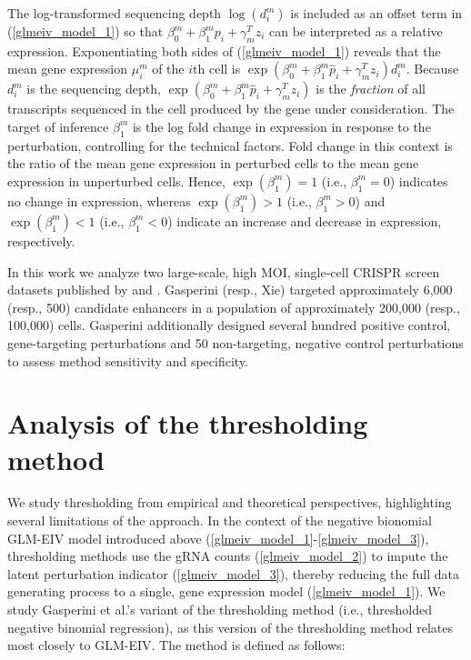 \documentclass[12pt]{article}
\begin{document}
The log-transformed sequencing depth $\log(d^m_i)$ is included as an offset term in (\ref{glmeiv_model_1}) so that $\beta^m_0 + \beta^m_1 p_i + \gamma^T_m z_i$ can be interpreted as a relative expression. Exponentiating both sides of (\ref{glmeiv_model_1}) reveals that the mean gene expression $\mu_i^m$ of the $i$th cell is
$\exp \left( \beta^m_0 + \beta^m_1 \hat{p}_i + \gamma^T_m z_i \right) d_i^m.$ Because $d^m_i$ is the sequencing depth, $\exp \left( \beta^m_0 + \beta^m_1 \hat{p}_i + \gamma^T_m z_i \right)$ is the \textit{fraction} of all transcripts sequenced in the cell produced by the gene under consideration. The target of inference $\beta^m_1$ is the log fold change in expression in response to the perturbation, controlling for the technical factors. Fold change in this context is the ratio of the mean gene expression in perturbed cells to the mean gene expression in unperturbed cells. Hence, $\exp(\beta^m_1) = 1$ (i.e., $\beta^m_1 = 0$) indicates no change in expression, whereas $\exp(\beta^m_1) > 1$ (i.e., $\beta^m_1 > 0$) and $\exp(\beta^m_1) < 1$ (i.e., $\beta^m_1 < 0$) indicate an increase and decrease in expression, respectively.

In this work we analyze two large-scale, high MOI, single-cell CRISPR screen datasets published by \parencite{Gasperini2019} and \parencite{Xie2019a}. Gasperini (resp., Xie) targeted approximately 6,000 (resp., 500) candidate enhancers in a population of approximately 200,000 (resp., 100,000) cells. Gasperini additionally designed several hundred positive control, gene-targeting perturbations and 50 non-targeting, negative control perturbations to assess method sensitivity and specificity.

\section{Analysis of the thresholding method}

We study thresholding from empirical and theoretical perspectives, highlighting several limitations of the approach. In the context of the negative bionomial GLM-EIV model introduced above (\ref{glmeiv_model_1}-\ref{glmeiv_model_3}), thresholding methods use the gRNA counts (\ref{glmeiv_model_2})
to impute the latent perturbation indicator (\ref{glmeiv_model_3}), thereby reducing the full data generating process to a single, gene expression model (\ref{glmeiv_model_1}). We study Gasperini et al.'s  variant of the thresholding method (i.e., thresholded negative binomial regression), as this version of the thresholding method relates most closely to GLM-EIV. The method is defined as follows:
\end{document}

